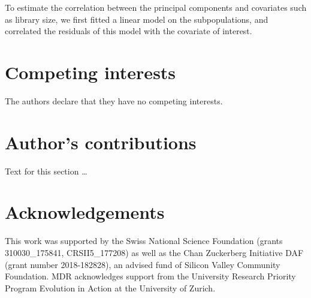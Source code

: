 \documentclass{bmcart}
\begin{document}
To estimate the correlation between the principal components and covariates such as library size, we first fitted a linear model on the subpopulations, and correlated the residuals of this model with the covariate of interest.



\begin{backmatter}

\section*{Competing interests}
  The authors declare that they have no competing interests.

\section*{Author's contributions}
    Text for this section \ldots

\section*{Acknowledgements}
This work was supported by the Swiss National Science Foundation (grants 310030_175841, CRSII5_177208) as well as the Chan
Zuckerberg Initiative DAF (grant number 2018-182828), an advised fund of Silicon Valley Community Foundation. MDR
acknowledges support from the University Research Priority Program Evolution in Action at the University of Zurich.


\end{backmatter}
\end{document}
